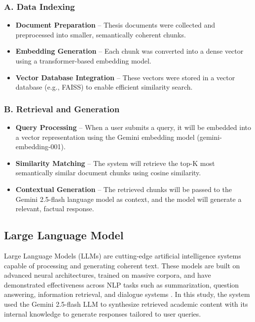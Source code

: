 \begin{refsection}
\subsubsection{A. Data Indexing}
\begin{itemize}
    \item \textbf{Document Preparation} – Thesis documents were collected and preprocessed into smaller, semantically coherent chunks.
    \item \textbf{Embedding Generation} – Each chunk was converted into a dense vector using a transformer-based embedding model.
    \item \textbf{Vector Database Integration} – These vectors were stored in a vector database (e.g., FAISS) to enable efficient similarity search.
\end{itemize}

\subsubsection{B. Retrieval and Generation}
\begin{itemize}
    \item \textbf{Query Processing} – When a user submits a query, it will be embedded into a vector representation using the Gemini embedding model (gemini-embedding-001).
    \item \textbf{Similarity Matching} – The system will retrieve the top-K most semantically similar document chunks using cosine similarity.
    \item \textbf{Contextual Generation} – The retrieved chunks will be passed to the Gemini 2.5-flash language model as context, and the model will generate a relevant, factual response.
\end{itemize}


\subsection{Large Language Model}

Large Language Models (LLMs) are cutting-edge artificial intelligence systems capable of processing and generating coherent text. These models are built on advanced neural architectures, trained on massive corpora, and have demonstrated effectiveness across NLP tasks such as summarization, question answering, information retrieval, and dialogue systems \citeauthor{naveed2024} \citeyear{naveed2024}. In this study, the system used the Gemini 2.5-flash LLM to synthesize retrieved academic content with its internal knowledge to generate responses tailored to user queries.



\end{refsection}
